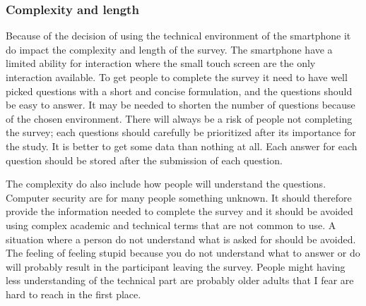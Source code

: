 
    \subsubsection*{Complexity and length}
      Because of the decision of using the technical environment of the smartphone it do impact the complexity and length of the survey. The smartphone have a limited ability for interaction where the small touch screen are the only interaction available. To get people to complete the survey it need to have well picked questions with a short and concise formulation, and the questions should be easy to answer. It may be needed to shorten the number of questions because of the chosen environment. There will always be a risk of people not completing the survey; each questions should carefully be prioritized after its importance for the study. It is better to get some data than nothing at all. Each answer for each question should be stored after the submission of each question. 

      The complexity do also include how people will understand the questions. Computer security are for many people something unknown. It should therefore provide the information needed to complete the survey and it should be avoided using complex academic and technical terms that are not common to use. A situation where a person do not understand what is asked for should be avoided. The feeling of feeling stupid because you do not understand what to answer or do will probably result in the participant leaving the survey. People might having less understanding of the technical part are probably older adults that I fear are hard to reach in the first place.


